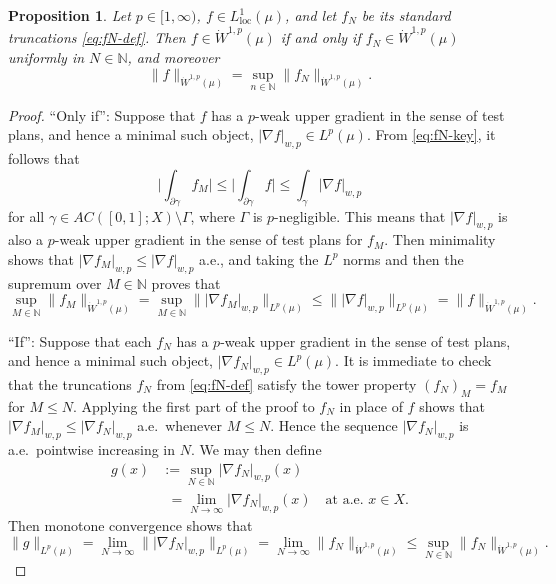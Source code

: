 \documentclass[11pt]{amsart}
\newtheorem{proposition}[theorem]{Proposition}
\theoremstyle{definition}
\theoremstyle{remark}
\numberwithin{equation}{section}
\newcommand{\abs}[1]{|#1|}
\newcommand{\Babs}[1]{\Big|#1\Big|}
\newcommand{\Norm}[2]{\|#1\|_{#2}}
\begin{document}
\begin{proposition}\label{prop:truncW1p}
Let $p\in[1,\infty)$, $f\in L^1_{\mathrm{loc}}(\mu)$, and let $f_N$ be its standard
truncations \eqref{eq:fN-def}. Then $f\in\dot W^{1,p}(\mu)$ if and only if $f_N\in \dot
W^{1,p}(\mu)$ uniformly in $N\in\mathbb N$, and moreover
\begin{equation*}
  \Norm{f}{\dot W^{1,p}(\mu)}=\sup_{n\in\mathbb N}\Norm{f_N}{\dot W^{1,p}(\mu)}.
\end{equation*}
\end{proposition}

\begin{proof}
``Only if'':  Suppose that $f$ has a $p$-weak upper gradient in the sense of test plans, and
hence a minimal such object, $\abs{\nabla f}_{w,p}\in L^p(\mu)$. From \eqref{eq:fN-key}, it
follows that
\begin{equation*}
  \Babs{\int_{\partial\gamma}f_M}
  \leq\Babs{\int_{\partial\gamma}f}
  \leq\int_\gamma\abs{\nabla f}_{w,p}
\end{equation*}
for all $\gamma\in AC([0,1];X)\setminus\Gamma$, where $\Gamma$ is $p$-negligible. This means
that $\abs{\nabla f}_{w,p}$ is also a $p$-weak upper gradient in the sense of test plans for
$f_M$. Then minimality shows that $\abs{\nabla f_M}_{w,p}\leq\abs{\nabla f}_{w,p}$ a.e., and
taking the $L^p$ norms and then the supremum over $M\in\mathbb N$ proves that
\begin{equation}\label{eq:truncW1p-easy}
  \sup_{M\in\mathbb N}\Norm{f_M}{\dot W^{1,p}(\mu)}
  =\sup_{M\in\mathbb N}\Norm{\abs{\nabla f_M}_{w,p}}{L^p(\mu)}
  \leq\Norm{\abs{\nabla f}_{w,p}}{L^p(\mu)}
  =\Norm{f}{\dot W^{1,p}(\mu)}.
\end{equation}


``If'': Suppose that each $f_N$ has a $p$-weak upper gradient in the sense of test plans,
and hence a minimal such object, $\abs{\nabla f_N}_{w,p}\in L^p(\mu)$. It is immediate to
check that the truncations $f_N$ from \eqref{eq:fN-def} satisfy the tower property
$(f_N)_M=f_M$ for $M\leq N$. Applying the first part of the proof to $f_N$ in place of $f$
shows that $\abs{\nabla f_M}_{w,p}\leq\abs{\nabla f_N}_{w,p}$ a.e.\ whenever $M\leq N$.
Hence the sequence $\abs{\nabla f_N}_{w,p}$ is a.e.\ pointwise increasing in $N$. We may
then define
\begin{equation*}
\begin{split}
  g(x) &:=\sup_{N\in\mathbb N}\abs{\nabla f_N}_{w,p}(x) \\
  &\phantom{:}=\lim_{N\to\infty}\abs{\nabla f_N}_{w,p}(x)\quad\text{at a.e. }x\in X.
\end{split}
\end{equation*}
Then monotone convergence shows that
\begin{equation*}
  \Norm{g}{L^p(\mu)}=\lim_{N\to\infty}\Norm{\abs{\nabla f_N}_{w,p}}{L^p(\mu)}
  =\lim_{N\to\infty}\Norm{f_N}{\dot W^{1,p}(\mu)}
  \leq  \sup_{N\in\mathbb N}\Norm{f_N}{\dot W^{1,p}(\mu)}.
\end{equation*}


\end{proof}
\end{document}

